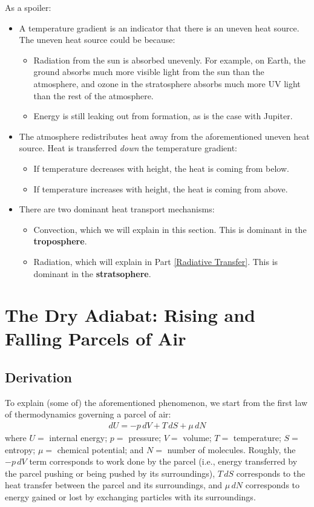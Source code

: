 \noindent As a spoiler:
\begin{itemize}
    \item A temperature gradient is an indicator that there is an uneven heat source. The uneven heat source could be because:
    \begin{itemize}
        \item Radiation from the sun is absorbed unevenly. For example, on Earth, the ground absorbs much more visible light from the sun than the atmosphere, and ozone in the stratosphere absorbs much more UV light than the rest of the atmosphere.
        \item Energy is still leaking out from formation, as is the case with Jupiter.
    \end{itemize}
    \item The atmosphere redistributes heat away from the aforementioned uneven heat source. Heat is transferred \textit{down} the temperature gradient:
    \begin{itemize}
        \item If temperature decreases with height, the heat is coming from below.
        \item If temperature increases with height, the heat is coming from above.
    \end{itemize}
    \item There are two dominant heat transport mechanisms:
    \begin{itemize}
        \item Convection, which we will explain in this section. This is dominant in the \textbf{troposphere}.
        \item Radiation, which will explain in Part \ref{Radiative Transfer}. This is dominant in the \textbf{stratsophere}.
    \end{itemize}
\end{itemize}


\section{The Dry Adiabat: Rising and Falling Parcels of Air}

\subsection{Derivation}

To explain (some of) the aforementioned phenomenon, we start from the first law of thermodynamics governing a parcel of air:
\begin{align}
    \label{First Law}
    dU=-p\,dV+T\,dS+\mu\,dN
\end{align}
where $U=$ internal energy; $p=$ pressure; $V=$ volume; $T=$ temperature; $S=$ entropy; $\mu=$ chemical potential; and $N=$ number of molecules. Roughly, the $-p\,dV$ term corresponds to work done by the parcel (i.e., energy transferred by the parcel pushing or being pushed by its surroundings), $T\,dS$ corresponds to the heat transfer between the parcel and its surroundings, and $\mu\,dN$ corresponds to energy gained or lost by exchanging particles with its surroundings.


